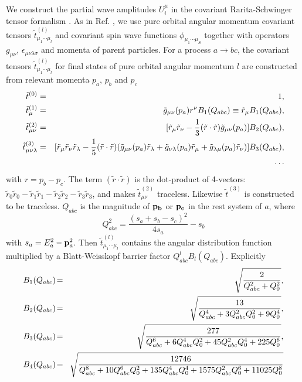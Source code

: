 We construct the partial wave amplitudes $U_i^{\mu}$ in the
covariant Rarita-Schwinger tensor formalism \cite{Rarita}. As in
Ref. \cite{Chung}, we use pure orbital angular momentum covariant
tensors $\tilde t^{(l)}_{\mu_1\cdots\mu_l}$  and covariant spin
wave functions $\phi_{\mu_1\cdots\mu_S}$ together with operators
$g_{\mu\nu}$, $\epsilon_{\mu\nu\lambda\sigma}$ and momenta of
parent particles. For a process $a\to bc$, the covariant tensors
$\tilde t^{(l)}_{\mu_1\cdots\mu_l}$ for final states of pure
orbital angular momentum $l$ are constructed from relevant momenta
$p_a$, $p_b$ and $p_c$ \cite{Chung}
\begin{eqnarray}
\tilde t^{(0)} &=& 1 , \\
\tilde t^{(1)}_\mu &=& \tilde g_{\mu\nu}(p_a)r^\nu B_1(Q_{abc})
\equiv\tilde r_\mu B_1(Q_{abc}),\\
\tilde t^{(2)}_{\mu\nu} &=& [\tilde r_\mu\tilde r_\nu
-{1\over 3}(\tilde r\cdot\tilde r)\tilde g_{\mu\nu}(p_a)]B_2(Q_{abc}), \\
\tilde t^{(3)}_{\mu\nu\lambda} &=& [\tilde r_\mu\tilde r_\nu\tilde
r_\lambda -{1\over 5}(\tilde r\cdot\tilde r)(\tilde
g_{\mu\nu}(p_a)\tilde r_\lambda +\tilde g_{\nu\lambda}(p_a)\tilde
r_\mu+\tilde g_{\lambda\mu}(p_a)\tilde r_\nu)]B_3(Q_{abc}),
\\
 & & \cdots  \nonumber
\end{eqnarray}
with $r=p_b-p_c$. The term $(\tilde r\cdot\tilde r)$ is the
dot-product of 4-vectors: $\tilde r_0 \tilde r_0 - \tilde r_1
\tilde r_1 - \tilde r_2 \tilde r_2 - \tilde r_3 \tilde r_3$, and
makes $\tilde t^{(2)}_{\mu \nu }$ traceless. Likewise $\tilde
t^{(3)}$ is constructed to be traceless. $Q_{abc}$ is the
magnitude of $\bf p_b$ or $\bf p_c$ in the rest system of $a$,
where
\begin{equation}
Q_{abc}^2=\frac{(s_{a}+s_{b}-s_{c})^{2}}{4s_{a}}-s_{b}
\end{equation}
with $s_a=E_a^2-{\bf p}^2_a$. Then $\tilde
t^{(l)}_{\mu_1\cdots\mu_l}$ contains the angular distribution
function multiplied by a Blatt-Weisskopf barrier
factor\cite{Chung,Hippel} $Q_{abc}^lB_l(Q_{abc})$. Explicitly
\begin{eqnarray}
B_1(Q_{abc})\!&=&\! \sqrt{2\over Q_{abc}^2+Q^2_0} ,\\
B_2(Q_{abc})\!&=&\! \sqrt{13\over Q_{abc}^4+3Q_{abc}^2Q^2_0+9Q_0^4}, \\
B_3(Q_{abc})\!&=&\! \sqrt{277\over
Q_{abc}^6+6Q_{abc}^4Q^2_0+45Q_{abc}^2Q_0^4
                    +225Q_0^6} , \\
B_4(Q_{abc})\!&=&\! \sqrt{12746\over
Q_{abc}^8+10Q_{abc}^6Q_0^2+135Q_{abc}^4Q^4_ 0
                    +1575Q_{abc}^2Q_0^6+11025Q_0^8}
\end{eqnarray}
